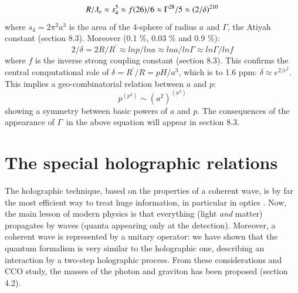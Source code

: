 \documentclass[twoside,draft]{article}
\begin{document}
\begin{sloppypar}
\begin{equation}
R/\lambdabar_{e} \approx s_4^5 \approx f(26)/6 \approx \Gamma^{28}/5 \approx (2/\delta)^{210}
\end{equation}
where $s_4 = 2\pi^2 a^3$ is the area of the 4-sphere of radius $a$ and $\Gamma$, the Atiyah constant (section 8.3). Moreover (0.1 \%, 0.03 \% and 0.9 \%):
\begin{equation}
2/\delta = 2R/R^{\prime} \approx lnp/lna \approx lna/ln\Gamma \approx ln\Gamma/lnf
\end{equation}
where $f$ is the inverse strong coupling constant (section 8.3). This  confirms the central computational role of $\delta = R^{\prime}/R = pH/a^{3}$, which is to 1.6 ppm: $\delta \approx e^{2/e^2}$. This implies a geo-combinatorial relation between $a$ and $p$:
\begin{equation}
 p^{(p^{2})} \sim (a^{2})^{(a^{3})}   
\end{equation}
showing a symmetry between basic powers of $a$ and $p$. The consequences of the appearance of $\Gamma$\ in the above equation will appear in section 8.3. 












\section{The special holographic relations}

The holographic technique, based on the properties of a coherent wave, is by far the most efficient way to treat huge information, in particular in optics \cite{Grosmann}. Now, the main lesson of modern physics is that everything (light \textit{and} matter) propagates by waves (quanta appearing only at the detection). Moreover, a coherent wave is represented by a unitary operator: we have shown that the quantum formalism is very similar to the holographic one, describing an interaction by a two-step holographic process. From these considerations and CCO study, the masses of the photon and graviton has been proposed (section 4.2).


\end{sloppypar}
\end{document}
